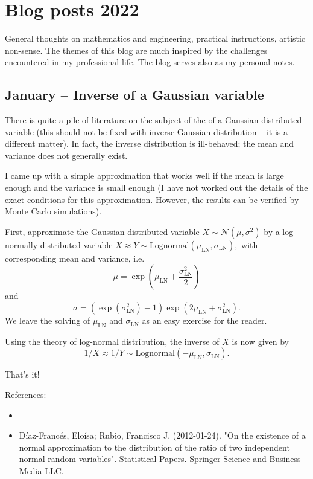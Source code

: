 \documentclass{article}
\begin{document}
\section{Blog posts 2022}

General thoughts on mathematics and engineering, practical instructions, artistic non-sense. The themes of this blog are much inspired by the challenges encountered in my professional life. The blog serves also as my personal notes.


\subsection{January – Inverse of a Gaussian variable}

There is quite a pile of literature on the subject of the  of a Gaussian distributed variable (this should not be fixed with inverse Gaussian distribution – it is a different matter). In fact, the inverse distribution is ill-behaved; the mean and variance does not generally exist.

I came up with a simple approximation that works well if the mean is large enough and the variance is small enough (I have not worked out the details of the exact conditions for this approximation. However, the results can be verified by Monte Carlo simulations). 

First, approximate the Gaussian distributed variable $X \sim \mathcal{N}(\mu, \sigma^2)$ by a log-normally distributed variable $X \approx Y \sim \text{Lognormal}(\mu_{\text{LN}}, \sigma_{\text{LN}}),$ with corresponding mean and variance, i.e.
$$\mu = \exp\left( \mu_{\text{LN}} + \frac{\sigma_{\text{LN}}^2}{2} \right)$$ and
$$\sigma = (\exp( \sigma_{\text{LN}}^2) - 1)\exp(2 \mu_{\text{LN}} + \sigma_{\text{LN}}^2).$$ We leave the solving of $\mu_{\text{LN}}$ and $\sigma_{\text{LN}}$ as an easy exercise for the reader.


Using the theory of log-normal distribution, the inverse of $X$ is now given by
$$
1/X \approx 1/Y \sim \text{Lognormal}(-\mu_{\text{LN}}, \sigma_{\text{LN}}).
$$

That's it!



References:
\begin{itemize}
\item {}
\item  Díaz-Francés, Eloísa; Rubio, Francisco J. (2012-01-24). "On the existence of a normal approximation to the distribution of the ratio of two independent normal random variables". Statistical Papers. Springer Science and Business Media LLC.
\end{itemize}
\end{document}

